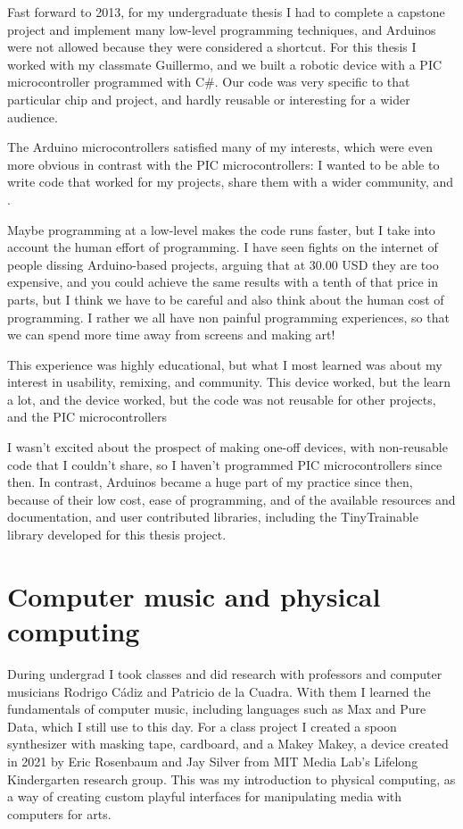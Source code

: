 Fast forward to 2013, for my undergraduate thesis I had to complete a capstone project and implement many low-level programming techniques, and Arduinos were not allowed because they were considered a shortcut. For this thesis I worked with my classmate Guillermo, and we built a robotic device with a \acrshort{PIC} microcontroller programmed with C\#. Our code was very specific to that particular chip and project, and hardly reusable or interesting for a wider audience.

The Arduino microcontrollers satisfied many of my interests, which were even more obvious in contrast with the \acrshort{PIC} microcontrollers: I wanted to be able to write code that worked for my projects, share them with a wider community, and .

Maybe programming at a low-level makes the code runs faster, but I take into account the human effort of programming. I have seen fights on the internet of people dissing Arduino-based projects, arguing that at 30.00 USD they are too expensive, and you could achieve the same results with a tenth of that price in parts, but I think we have to be careful and also think about the human cost of programming. I rather we all have non painful programming experiences, so that we can spend more time away from screens and making art!

This experience was highly educational, but what I most learned was about my interest in usability, remixing, and community. This device worked, but the 
 learn a lot, and the device worked, but the code was not reusable for other projects, and the \acrshort{PIC} microcontrollers

I wasn't excited about the prospect of making one-off devices, with non-reusable code that I couldn't share, so I haven't programmed \acrshort{PIC} microcontrollers since then. In contrast, Arduinos became a huge part of my practice since then, because of their low cost, ease of programming, and of the available resources and documentation, and user contributed libraries, including the TinyTrainable library developed for this thesis project.

\section{Computer music and physical computing}

During undergrad I took classes and did research with professors and computer musicians Rodrigo Cádiz and Patricio de la Cuadra. With them I learned the fundamentals of computer music, including languages such as Max and Pure Data, which I still use to this day. For a class project I created a spoon synthesizer with masking tape, cardboard, and a Makey Makey, a device created in 2021 by Eric Rosenbaum and Jay Silver from MIT Media Lab's Lifelong Kindergarten research group. This was my introduction to physical computing, as a way of creating custom playful interfaces for manipulating media with computers for arts.
 
